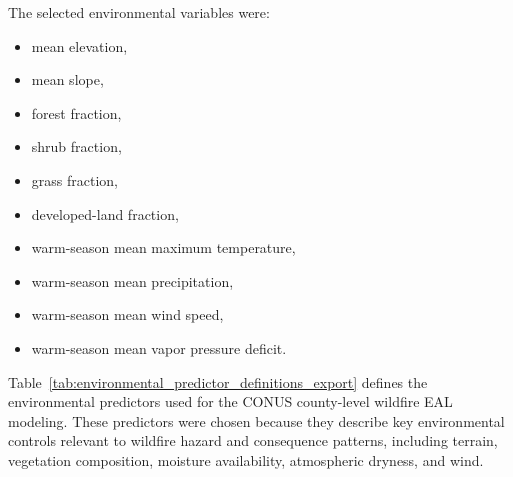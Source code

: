The selected environmental variables were:
\begin{itemize}
    \item mean elevation,
    \item mean slope,
    \item forest fraction,
    \item shrub fraction,
    \item grass fraction,
    \item developed-land fraction,
    \item warm-season mean maximum temperature,
    \item warm-season mean precipitation,
    \item warm-season mean wind speed,
    \item warm-season mean vapor pressure deficit.
\end{itemize}

Table~\ref{tab:environmental_predictor_definitions_export} defines the environmental predictors used for the CONUS county-level wildfire EAL modeling. These predictors were chosen because they describe key environmental controls relevant to wildfire hazard and consequence patterns, including terrain, vegetation composition, moisture availability, atmospheric dryness, and wind.



